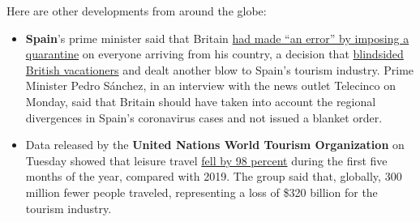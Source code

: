Here are other developments from around the globe:

\begin{itemize}
\item
  \textbf{Spain}'s prime minister said that Britain
  \href{https://www.nytimes3xbfgragh.onion/2020/07/28/world/europe/spain-britain-quarantine-order.html}{had
  made ``an error'' by imposing a quarantine} on everyone arriving from
  his country, a decision that
  \href{https://www.nytimes3xbfgragh.onion/2020/07/26/world/europe/Spain-quarantine-UK-travel.html}{blindsided
  British vacationers} and dealt another blow to Spain's tourism
  industry. Prime Minister Pedro Sánchez, in an interview with the news
  outlet Telecinco on Monday, said that Britain should have taken into
  account the regional divergences in Spain's coronavirus cases and not
  issued a blanket order.
\item
  Data released by the \textbf{United Nations World Tourism
  Organization} on Tuesday showed that leisure travel
  \href{https://www.unwto.org/news/impact-of-covid-19-on-global-tourism-made-clear-as-unwto-counts-the-cost-of-standstill}{fell
  by 98 percent} during the first five months of the year, compared with
  2019. The group said that, globally, 300 million fewer people
  traveled, representing a loss of \$320 billion for the tourism
  industry.
\end{itemize}


